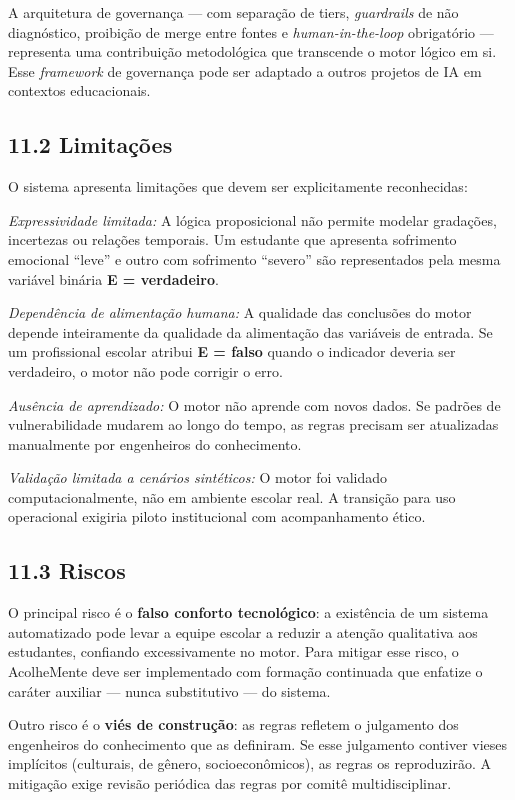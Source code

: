 \documentclass[11pt]{article}
\begin{document}
A arquitetura de governança --- com separação de tiers,
\emph{guardrails} de não diagnóstico, proibição de merge entre fontes e
\emph{human-in-the-loop} obrigatório --- representa uma contribuição
metodológica que transcende o motor lógico em si. Esse \emph{framework}
de governança pode ser adaptado a outros projetos de IA em contextos
educacionais.

\subsection{11.2 Limitações}\label{limitauxe7uxf5es}

O sistema apresenta limitações que devem ser explicitamente
reconhecidas:

\emph{Expressividade limitada:} A lógica proposicional não permite
modelar gradações, incertezas ou relações temporais. Um estudante que
apresenta sofrimento emocional ``leve'' e outro com sofrimento
``severo'' são representados pela mesma variável binária \textbf{E =
verdadeiro}.

\emph{Dependência de alimentação humana:} A qualidade das conclusões do
motor depende inteiramente da qualidade da alimentação das variáveis de
entrada. Se um profissional escolar atribui \textbf{E = falso} quando o
indicador deveria ser verdadeiro, o motor não pode corrigir o erro.

\emph{Ausência de aprendizado:} O motor não aprende com novos dados. Se
padrões de vulnerabilidade mudarem ao longo do tempo, as regras precisam
ser atualizadas manualmente por engenheiros do conhecimento.

\emph{Validação limitada a cenários sintéticos:} O motor foi validado
computacionalmente, não em ambiente escolar real. A transição para uso
operacional exigiria piloto institucional com acompanhamento ético.

\subsection{11.3 Riscos}\label{riscos}

O principal risco é o \textbf{falso conforto tecnológico}: a existência
de um sistema automatizado pode levar a equipe escolar a reduzir a
atenção qualitativa aos estudantes, confiando excessivamente no motor.
Para mitigar esse risco, o AcolheMente deve ser implementado com
formação continuada que enfatize o caráter auxiliar --- nunca
substitutivo --- do sistema.

Outro risco é o \textbf{viés de construção}: as regras refletem o
julgamento dos engenheiros do conhecimento que as definiram. Se esse
julgamento contiver vieses implícitos (culturais, de gênero,
socioeconômicos), as regras os reproduzirão. A mitigação exige revisão
periódica das regras por comitê multidisciplinar.
\end{document}
